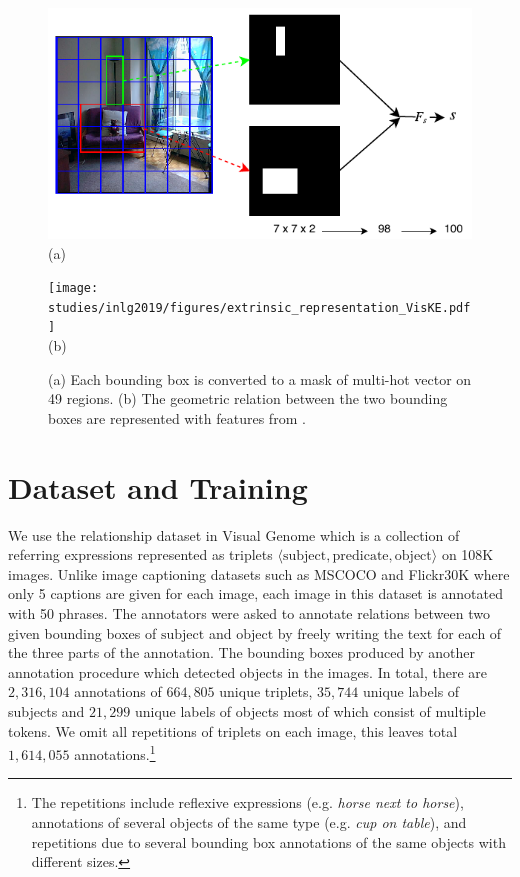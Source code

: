\begin{figure}[htb]
	\begin{minipage}{0.63\linewidth}
		\centering
		\includegraphics[scale=0.65]{studies/inlg2019/figures/extrinsic_representation_mask.pdf} \\
		(a)
	\end{minipage}%
	\begin{minipage}{0.37\linewidth}
		\centering
		\texttt{[image: studies/inlg2019/figures/extrinsic\_representation\_VisKE.pdf]} \\
		(b)
	\end{minipage}%
	\caption{
		(a) Each bounding box is converted to a mask of multi-hot vector on 49 regions.
		(b) The geometric relation between the two bounding boxes are represented with features from \cite{sadeghi2015viske}.
	}
	\label{inlg2019:fig:spatial}
\end{figure}





\section{Dataset and Training}\label{inlg2019:sec:dataset}

We %
use the relationship dataset in Visual Genome \cite{krishna2017visual} which is
a collection of referring expressions represented as triplets $\langle \mathrm{subject}, \mathrm{predicate}, \mathrm{object} \rangle$ on 108K images.
Unlike image captioning datasets such as MSCOCO \cite{chen2015microsoft} and Flickr30K \cite{plummer2015flickr30k} where only 5 captions are given for each image, each image in this dataset is annotated with 50 phrases.
The annotators were asked to annotate relations between two given bounding boxes of $\mathrm{subject}$ and $\mathrm{object}$ by freely writing the text for each of the three parts of the annotation.
The bounding boxes %
produced by another annotation procedure which detected objects in the images. %
In total, there are $2,316,104$ annotations of $664,805$ unique triplets, $35,744$ unique labels of subjects and $21,299$ unique labels of objects most of which
consist of multiple tokens.
We omit all repetitions of triplets on each image, this leaves total $1,614,055$ annotations.\footnote{The repetitions include reflexive expressions (e.g. \emph{horse next to horse}), annotations of several objects of the same type (e.g. \emph{cup on table}), and repetitions due to several bounding box annotations of the same objects with different sizes.} %


